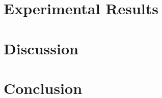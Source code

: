 \documentclass[conference]{IEEEtran}
\begin{document}
\section{Experimental Results}\label{sec:expresults}




\section{Discussion}\label{sec:disc}




\section{Conclusion}\label{sec:conc}





\end{document}
